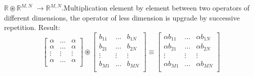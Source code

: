 \documentclass[11pt]{article}
\newcommand{\mulebe}{\circledast}
\newcommand{\dimsep}{,}
\begin{document}
 $\mathbb{R}\mulebe \mathbb{R}^{M\dimsep N}$ $\rightarrow \mathbb{R}^{M\dimsep N}$.Multiplication element by element 
  between two operators of different dimensions, the operator of less dimension is upgrade by 
  successive repetition. Result: 
\begin{equation}
  \left[
 \begin{matrix}
 \alpha &\hdots &\alpha\\ 
 \alpha &\hdots &\alpha\\
 \vdots &\vdots &\vdots\\ 
 \alpha &\hdots &\alpha\\ 
 \end{matrix}
 \right]\mulebe 
   \left[
 \begin{matrix}
 b_{11} &\hdots &b_{1N}\\ 
 b_{21} &\hdots &b_{2N}\\
 \vdots &\vdots &\vdots\\ 
 b_{M1} &\hdots &b_{MN}\\ 
 \end{matrix}
 \right]
 \equiv \left[
 \begin{matrix}
 \alpha b_{11} &\hdots &\alpha b_{1N}\\ 
 \alpha b_{21} &\hdots &\alpha b_{2N}\\
 \vdots &\vdots &\vdots\\ 
 \alpha b_{M1} &\hdots &\alpha b_{MN}\\ 
 \end{matrix}
 \right]
 \end{equation}
\end{document}
